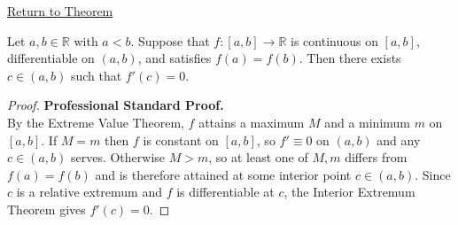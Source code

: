 \newpage
{}
\label{prf:rolles-theorem}

\begin{remark*}[Return]
\hyperref[thm:rolles-theorem]{Return to Theorem}
\end{remark*}

\begin{theorem*}
Let $a, b \in \mathbb{R}$ with $a < b$. Suppose that $f : [a,b] \to \mathbb{R}$ is continuous on $[a,b]$, differentiable on $(a,b)$, and satisfies $f(a) = f(b)$. Then there exists $c \in (a,b)$ such that $f'(c) = 0$.
\end{theorem*}

\begin{proof}
\textbf{Professional Standard Proof.}~\\
By the Extreme Value Theorem, $f$ attains a maximum $M$ and a minimum $m$ on $[a,b]$. If $M = m$ then $f$ is constant on $[a,b]$, so $f' \equiv 0$ on $(a,b)$ and any $c \in (a,b)$ serves. Otherwise $M > m$, so at least one of $M, m$ differs from $f(a) = f(b)$ and is therefore attained at some interior point $c \in (a,b)$. Since $c$ is a relative extremum and $f$ is differentiable at $c$, the Interior Extremum Theorem gives $f'(c) = 0$.
\end{proof}

